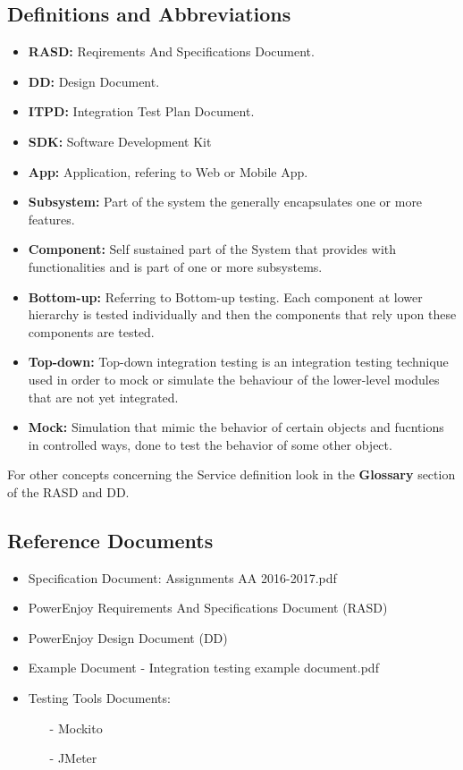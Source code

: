 \documentclass[a4paper]{article}
\begin{document}
\subsection{Definitions and Abbreviations}
\begin{itemize}
\item \textbf{RASD:} Reqirements And Specifications Document.
\item \textbf{DD:} Design Document.
\item \textbf{ITPD:} Integration Test Plan Document.
\item \textbf{SDK:} Software Development Kit
\item \textbf{App:} Application, refering to Web or Mobile App.
\item \textbf{Subsystem:} Part of the system the generally encapsulates one or more features.
\item \textbf{Component:} Self sustained part of the System that provides with functionalities and is part of one or more subsystems.
\item \textbf{Bottom-up:} Referring to Bottom-up testing. Each component at lower hierarchy is tested individually and then the components that rely upon these components are tested.
\item \textbf{Top-down:} Top-down integration testing is an integration testing technique used in order to mock or simulate the behaviour of the lower-level modules that are not yet integrated.
\item \textbf{Mock:} Simulation that mimic the behavior of certain objects and fucntions in controlled ways, done to test the behavior of some other object.
\end{itemize}
For other concepts concerning the Service definition look in the \textbf{Glossary} section of the RASD and DD.

\subsection{Reference Documents}
\begin{itemize}
\item Specification Document: Assignments AA 2016-2017.pdf
\item PowerEnjoy Requirements And Specifications Document (RASD)
\item PowerEnjoy Design Document (DD)
\item Example Document - Integration testing example document.pdf
\item Testing Tools Documents:
\begin{itemize}
\item[-] Mockito
\item[-] JMeter
\end{itemize}
\end{itemize}
\end{document}
